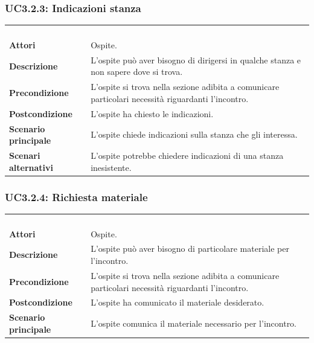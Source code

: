 \subsubsection{UC3.2.3: Indicazioni stanza}
\label{UC3.2.3}
\begin{longtable}{l|p{10cm}}
\rowcolor[gray]{0.8} \multicolumn{2}{c}{} \\
\rowcolor[gray]{0.8} \multicolumn{2}{c}{\textbf{UC3.2.3 - Indicazioni stanza}} \\
\rowcolor[gray]{0.8} \multicolumn{2}{c}{} \\
\hline
&\\
\textbf{Attori} & Ospite.\\[7pt]
\textbf{Descrizione} & L'ospite può aver bisogno di dirigersi in qualche stanza e non sapere dove si trova.\\[7pt]
\textbf{Precondizione} & L'ospite si trova nella sezione adibita a comunicare particolari necessità riguardanti l'incontro.\\[7pt]
\textbf{Postcondizione} & L'ospite ha chiesto le indicazioni.\\[7pt]
\textbf{Scenario principale} &L'ospite chiede indicazioni sulla stanza che gli interessa.\\[7pt]
\textbf{Scenari alternativi} & L'ospite potrebbe chiedere indicazioni di una stanza inesistente.\\[7pt]\hline
\end{longtable}

\subsubsection{UC3.2.4: Richiesta materiale}
\label{UC3.2.4}
\begin{longtable}{l|p{10cm}}
\rowcolor[gray]{0.8} \multicolumn{2}{c}{} \\
\rowcolor[gray]{0.8} \multicolumn{2}{c}{\textbf{UC3.2.4 - Richiesta materiale}} \\
\rowcolor[gray]{0.8} \multicolumn{2}{c}{} \\
\hline
&\\
\textbf{Attori} & Ospite.\\[7pt]
\textbf{Descrizione} & L'ospite può aver bisogno di particolare materiale per l'incontro.\\[7pt]
\textbf{Precondizione} & L'ospite si trova nella sezione adibita a comunicare particolari necessità riguardanti l'incontro.\\[7pt]
\textbf{Postcondizione} & L'ospite ha comunicato il materiale desiderato.\\[7pt]
\textbf{Scenario principale} &L'ospite comunica il materiale necessario per l'incontro.\\[7pt]\hline
\end{longtable}

